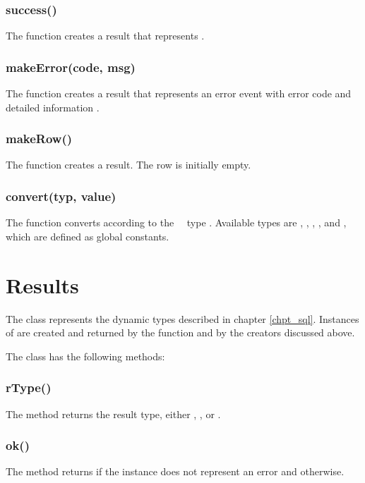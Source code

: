 \subsubsection{success()}
The function creates a  result
that represents .

\subsubsection{makeError(code, msg)}
The function creates a  result
that represents an error event with error code
 and detailed information .

\subsubsection{makeRow()}
The function creates a  result.
The row is initially empty.

\subsubsection{convert(typ, value)}
The function converts  according
to the \nowdb\ \sql\ type .
Available types are
, ,
, ,  and
,
which are defined as global constants.

\section{Results}
The  class represents
the dynamic types described in chapter \ref{chpt_sql}.
Instances of  are
created and returned by
the  function
and by the  creators discussed above.

The  class has the following methods:

\subsubsection{rType()}
The method returns the result type,
either ,
,  or .

\subsubsection{ok()}
The method returns 
if the instance does not represent
an error and  otherwise.

